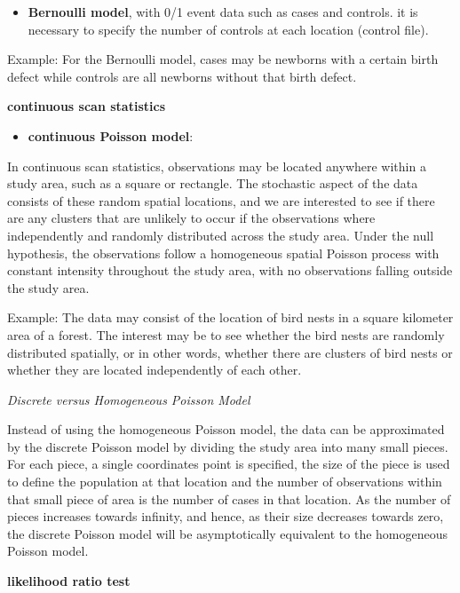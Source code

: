 \documentclass[
]{article}
\providecommand{\tightlist}{%
  \setlength{\itemsep}{0pt}\setlength{\parskip}{0pt}}
\begin{document}
\begin{itemize}
\tightlist
\item
  \textbf{Bernoulli model}, with 0/1 event data such as cases and
  controls. it is necessary to specify the number of controls at each
  location (control file).
\end{itemize}

Example: For the Bernoulli model, cases may be newborns with a certain
birth defect while controls are all newborns without that birth defect.

\textbf{continuous scan statistics}

\begin{itemize}
\tightlist
\item
  \textbf{continuous Poisson model}:
\end{itemize}

In continuous scan statistics, observations may be located anywhere
within a study area, such as a square or rectangle. The stochastic
aspect of the data consists of these random spatial locations, and we
are interested to see if there are any clusters that are unlikely to
occur if the observations where independently and randomly distributed
across the study area. Under the null hypothesis, the observations
follow a homogeneous spatial Poisson process with constant intensity
throughout the study area, with no observations falling outside the
study area.

Example: The data may consist of the location of bird nests in a square
kilometer area of a forest. The interest may be to see whether the bird
nests are randomly distributed spatially, or in other words, whether
there are clusters of bird nests or whether they are located
independently of each other.

\emph{Discrete versus Homogeneous Poisson Model}

Instead of using the homogeneous Poisson model, the data can be
approximated by the discrete Poisson model by dividing the study area
into many small pieces. For each piece, a single coordinates point is
specified, the size of the piece is used to define the population at
that location and the number of observations within that small piece of
area is the number of cases in that location. As the number of pieces
increases towards infinity, and hence, as their size decreases towards
zero, the discrete Poisson model will be asymptotically equivalent to
the homogeneous Poisson model.

\textbf{likelihood ratio test}
\end{document}

